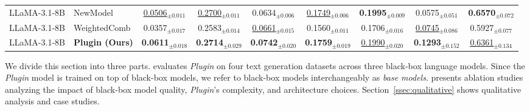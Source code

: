\begin{table*}[t]
{\begin{tabular}{|llccccccc|}
        LLaMA-3.1-8B & NewModel & \underline{0.0506}$_{\pm0.011}$ & \underline{0.2700}$_{\pm0.011}$ & 0.0634$_{\pm0.006}$ & \underline{0.1749}$_{\pm0.006}$ & \textbf{0.1995}$_{\pm0.009}$ & 0.0575$_{\pm0.051}$ & \textbf{0.6570}$_{\pm0.072}$\\
        LLaMA-3.1-8B & WeightedComb & 0.0357$_{\pm0.017}$ & 0.2583$_{\pm0.014}$ & \underline{0.0661}$_{\pm0.015}$ & 0.1560$_{\pm0.011}$ & 0.1706$_{\pm0.016}$ & \underline{0.0745}$_{\pm0.086}$ & 0.5927$_{\pm0.077}$\\
        LLaMA-3.1-8B & \textbf{Plugin (Ours)} & \textbf{0.0611}$_{\pm0.018}$ & \textbf{0.2714}$_{\pm0.029}$ & \textbf{0.0742}$_{\pm0.020}$ & \textbf{0.1759}$_{\pm0.019}$ & \underline{0.1990}$_{\pm0.020}$ & \textbf{0.1293}$_{\pm0.152}$ & \underline{0.6361}$_{\pm0.134}$\\
        \hline
    \end{tabular}
    }
        \vspace{-3mm}

\end{table*}

We divide this section into three parts. 
 evaluates \textit{Plugin} on four text generation datasets across three black-box language models. Since the \textit{Plugin} model is trained on top of black-box models, we refer to black-box models interchangeably as \emph{base models}. 
 presents ablation studies analyzing the impact of black-box model quality, \textit{Plugin}'s complexity, and architecture choices.
Section~\ref{ssec:qualitative} shows qualitative analysis and case studies.


